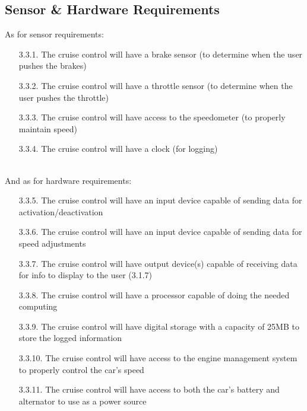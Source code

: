 \documentclass{article}
\begin{document}
	\subsection{Sensor \& Hardware Requirements}
	\indent\indent As for sensor requirements:
	\begin{enumerate}
		\item[3.3.1.] The cruise control will have a brake sensor (to determine when the user pushes the brakes)
		\item[3.3.2.] The cruise control will have a throttle sensor (to determine when the user pushes the throttle)
		\item[3.3.3.] The cruise control will have access to the speedometer (to properly maintain speed)
		\item[3.3.4.] The cruise control will have a clock (for logging)
	\end{enumerate} \ \\
	\indent And as for hardware requirements:
	\begin{enumerate}
		\item[3.3.5.] The cruise control will have an input device capable of sending data for activation/deactivation
		\item[3.3.6.] The cruise control will have an input device capable of sending data for speed adjustments
		\item[3.3.7.] The cruise control will have output device(s) capable of receiving data for info to display to the user (3.1.7)
		\item[3.3.8.] The cruise control will have a processor capable of doing the needed computing
		\item[3.3.9.] The cruise control will have digital storage with a capacity of 25MB to store the logged information
		\item[3.3.10.] The cruise control will have access to the engine management system to properly control the car's speed
		\item[3.3.11.] The cruise control will have access to both the car's battery and alternator to use as a power source
	\end{enumerate}
	
\end{document}
